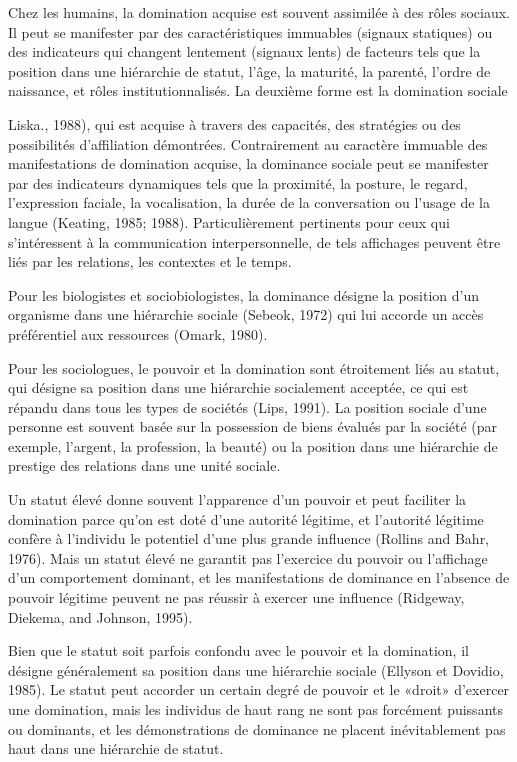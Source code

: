 Chez les humains, la domination acquise est souvent assimilée à des rôles sociaux. Il peut se manifester par des caractéristiques immuables (signaux statiques) ou des indicateurs qui changent lentement (signaux lents) de facteurs tels que la position dans une hiérarchie de statut, l'âge, la maturité, la parenté, l'ordre de naissance, et rôles institutionnalisés. La deuxième forme est la domination sociale {Liska., 1988), qui est acquise à travers des capacités, des stratégies ou des possibilités d'affiliation démontrées. Contrairement au caractère immuable des manifestations de domination acquise, la dominance sociale peut se manifester par des indicateurs dynamiques tels que la proximité, la posture, le regard, l'expression faciale, la vocalisation, la durée de la conversation ou l'usage de la langue (Keating, 1985; 1988). Particulièrement pertinents pour ceux qui s'intéressent à la communication interpersonnelle, de tels affichages peuvent être liés par les relations, les contextes et le temps.

Pour les biologistes et sociobiologistes, la dominance désigne la position d'un organisme dans une hiérarchie sociale (Sebeok, 1972) qui lui accorde un accès préférentiel aux ressources (Omark, 1980).

Pour les sociologues, le pouvoir et la domination sont étroitement liés au statut, qui désigne sa position dans une hiérarchie socialement acceptée, ce qui est répandu dans tous les types de sociétés (Lips, 1991). La position sociale d'une personne est souvent basée sur la possession de biens évalués par la société (par exemple, l'argent, la profession, la beauté) ou la position dans une hiérarchie de prestige des relations dans une unité sociale.

Un statut élevé donne souvent l'apparence d'un pouvoir et peut faciliter la domination parce qu'on est doté d'une autorité légitime, et l'autorité légitime confère à l'individu le potentiel d'une plus grande influence (Rollins and Bahr, 1976). Mais un statut élevé ne garantit pas l'exercice du pouvoir ou l'affichage d'un comportement dominant, et les manifestations de dominance en l'absence de pouvoir légitime peuvent ne pas réussir à exercer une influence (Ridgeway, Diekema, and Johnson, 1995).

Bien que le statut soit parfois confondu avec le pouvoir et la domination, il désigne généralement sa position dans une hiérarchie sociale (Ellyson et Dovidio, 1985). Le statut peut accorder un certain degré de pouvoir et le «droit» d'exercer une domination, mais les individus de haut rang ne sont pas forcément puissants ou dominants, et les démonstrations de dominance ne placent inévitablement pas haut dans une hiérarchie de statut\cite{burgoon1998nature}.

}
